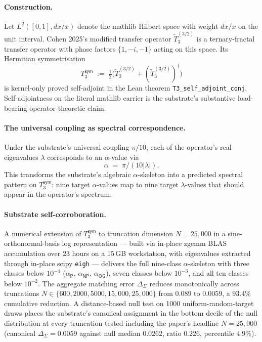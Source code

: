 \documentclass[11pt,a4paper]{amsart}
\theoremstyle{plain}
\theoremstyle{definition}
\begin{document}
\paragraph{Construction.} Let $L^2([0,1], dx/x)$ denote the mathlib Hilbert space with weight $dx/x$ on the unit interval. Cohen 2025's modified transfer operator $\widetilde{T}_3^{(3/2)}$ is a ternary-fractal transfer operator with phase factors $\{1, -i, -1\}$ acting on this space. Its Hermitian symmetrisation
\[
T_3^{\textsf{sym}} \;:=\; \tfrac{1}{2}\bigl(\widetilde{T}_3^{(3/2)} + (\widetilde{T}_3^{(3/2)})^\dagger\bigr)
\]
is kernel-only proved self-adjoint in the Lean theorem \texttt{T3\_self\_adjoint\_conj}. Self-adjointness on the literal mathlib carrier is the substrate's substantive load-bearing operator-theoretic claim.

\paragraph{The universal coupling as spectral correspondence.} Under the substrate's universal coupling $\pi/10$, each of the operator's real eigenvalues $\lambda$ corresponds to an $\alpha$-value via
\[
\alpha \;=\; \pi / (10 |\lambda|).
\]
This transforms the substrate's algebraic $\alpha$-skeleton into a predicted spectral pattern on $T_3^{\textsf{sym}}$: nine target $\alpha$-values map to nine target $\lambda$-values that should appear in the operator's spectrum.

\paragraph{Substrate self-corroboration.} A numerical extension of $T_3^{\textsf{sym}}$ to truncation dimension $N = 25{,}000$ in a sine-orthonormal-basis log representation --- built via in-place zgemm BLAS accumulation over 23 hours on a 15\,GB workstation, with eigenvalues extracted through in-place scipy \texttt{eigh} --- delivers the full nine-class $\alpha$-skeleton with three classes below $10^{-4}$ ($\alpha_{\textsf{P}}$, $\alpha_{\textsf{NP}}$, $\alpha_{\textsf{QG}}$), seven classes below $10^{-3}$, and all ten classes below $10^{-2}$. The aggregate matching error $\Delta_\Sigma$ reduces monotonically across truncations $N \in \{600, 2000, 5000, 15{,}000, 25{,}000\}$ from $0.089$ to $0.0059$, a $93.4\%$ cumulative reduction. A distance-based null test on 1000 uniform-random-target draws places the substrate's canonical assignment in the bottom decile of the null distribution at every truncation tested including the paper's headline $N = 25{,}000$ (canonical $\Delta_\Sigma = 0.0059$ against null median $0.0262$, ratio $0.226$, percentile $4.9\%$).
\end{document}

